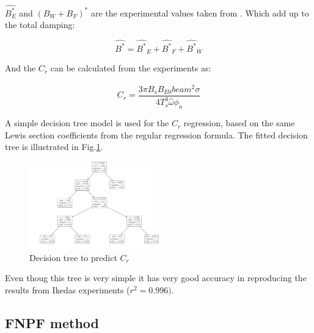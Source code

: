     $\hat{B_E^*}$ and $(B_W+B_F)^*$ are the experimental values taken
from \citep{7505983/4AFVVGNT}. Which add up to the total damping:
 
            
    
    \begin{equation}
\hat{B^*} = \hat{B^*}_{E} + \hat{B^*}_{F} + \hat{B^*}_{W}
\label{eq:B_star_hat}
\end{equation}

    

    And the $C_r$ can be calculated from the experiments as:
 
            
    
    \begin{equation}
C_{r} = \frac{3 \pi B_{s} \hat{B}_{E0} beam^{2} \sigma}{4 T_{s}^{3} \hat{\omega} \phi_{a}}
\label{eq:C_r_2}
\end{equation}

    

    A simple decision tree model is used for the $C_r$ regression, based
on the same Lewis section coefficients from the regular regression
formula. The fitted decision tree is illustrated in
Fig.\ref{fig:decision_tree}.

    

    \begin{figure}[H]
        \begin{center}\includegraphics[width = 0.5\textwidth]{figures/decision_tree.pdf}\end{center}
        \vspace{-1cm}
        \caption{Decision tree to predict $C_r$}
        \label{fig:decision_tree}
    \end{figure}
    
    Even thoug this tree is very simple it has very good accuracy in
reproducing the results from Ikedas experiments ($r^2=0.996)$.

    \subsection*{FNPF method}\label{fnpf-method}

